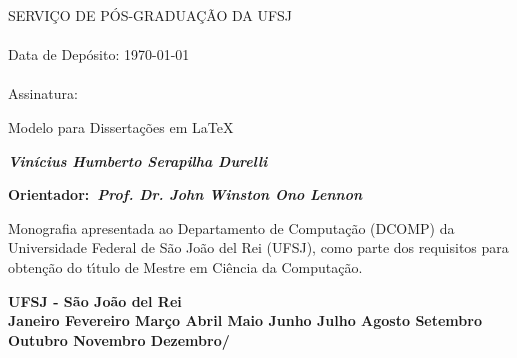 \begin{flushright}
\begin{Sbox}
\begin{minipage}{8cm}
\footnotesize{
    SERVI\c{C}O DE P{\'O}S-GRADUA\c{C}{\~A}O DA UFSJ\\ \\
    Data de Dep{\'o}sito: \today \\ \\
    Assinatura:} \hrulefill
\end{minipage}
\end{Sbox}
\fbox{\TheSbox}
\end{flushright}

\vspace*{3cm}
\begin{center}
{\Large\sf Modelo para Dissertações em \LaTeX}

\vspace*{2cm} \textbf{\textit{Vin\'icius Humberto Serapilha Durelli}}

\vspace*{2cm}
\textbf{Orientador:~\textit{Prof. Dr. John Winston Ono Lennon}}
\end{center}
\vspace*{3.5cm}
\begin{flushright}
\begin{minipage}{10cm}
	Monografia apresentada ao Departamento de Computação (DCOMP) da Universidade Federal de São João del Rei (UFSJ), 
	como parte dos requisitos para obten\c{c}{\~a}o do t{\'\i}tulo de Mestre em Ci{\^e}ncia da Computa\c{c}{\~a}o.
\end{minipage}
\end{flushright}
\vspace*{2.5cm}
\begin{center}
\textbf{UFSJ - S{\~a}o João del Rei \\
        \ifcase\month\or
              Janeiro\or
              Fevereiro\or
              Mar\c{c}o\or
              Abril\or
              Maio\or
              Junho\or
              Julho\or
              Agosto\or
              Setembro\or
              Outubro\or
              Novembro\or
              Dezembro\fi/\the\year}
\end{center}
\cleardoublepage

